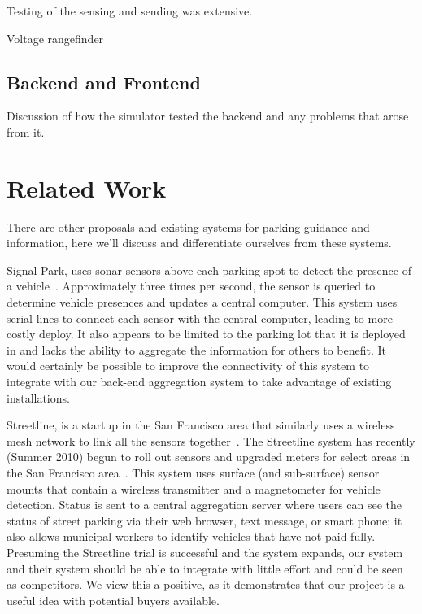 \documentclass{acm_proc}
\begin{document}
Testing of the sensing and sending was extensive.  

Voltage rangefinder 

\subsection{Backend and Frontend}

Discussion of how the simulator tested the backend and any problems that
arose from it.

\section{Related Work}\label{sec:related}

There are other proposals and existing systems for parking guidance and
information, here we'll discuss and differentiate ourselves from these
systems.

Signal-Park, uses sonar sensors above each parking spot to detect the
presence of a vehicle~\cite{pgi:signal-park}.
Approximately three times per second, the sensor is queried to determine
vehicle presences and updates a central computer.
This system uses serial lines to connect each sensor with the central
computer, leading to more costly deploy.
It also appears to be limited to the parking lot that it is deployed in and
lacks the ability to aggregate the information for others to benefit.
It would certainly be possible to improve the connectivity of this system
to integrate with our back-end aggregation system to take advantage of
existing installations.

Streetline, is a startup in the San Francisco area that similarly uses a
wireless mesh network to link all the sensors
together~\cite{pgi:streetline}.
The Streetline system has recently (Summer 2010) begun to roll out sensors
and upgraded meters for select areas in the San Francisco
area~\cite{wired:streetline, sfpark}.
This system uses surface (and sub-surface) sensor mounts that contain a
wireless transmitter and a magnetometer for vehicle detection.
Status is sent to a central aggregation server where users can see the
status of street parking via their web browser, text message, or smart
phone; it also allows municipal workers to identify vehicles that have not
paid fully.
Presuming the Streetline trial is successful and the system expands, our
system and their system should be able to integrate with little effort and
could be seen as competitors.
We view this a positive, as it demonstrates that our project is a useful
idea with potential buyers available.
\end{document}
